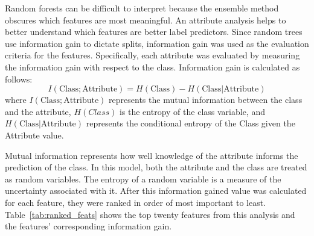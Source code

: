 \documentclass[10pt,twocolumn,conference]{IEEEtran}
\begin{document}
Random forests can be difficult to interpret because the ensemble method obscures which features are most meaningful.  An attribute analysis helps to better understand which features are better label predictors.  Since random trees use information gain to dictate splits, information gain was used as the evaluation criteria for the features.  Specifically, each attribute was evaluated by measuring the information gain with respect to the class.  Information gain is calculated as follows:
\begin{equation}
I(\text{Class}; \text{Attribute}) = H(\text{Class}) - H(\text{Class} | \text{Attribute})
\end{equation} \label{eq:info_gained}
where $I(\text{Class}; \text{Attribute})$ represents the mutual information between the class and the attribute, $H(Class)$ is the entropy of the class variable, and  $H(\text{Class} | \text{Attribute})$ represents the conditional entropy of the Class given the Attribute value.  

Mutual information represents how well knowledge of the attribute informs the prediction of the class.  In this model, both the attribute and the class are treated as random variables.  The entropy of a random variable is a measure of the uncertainty associated with it. After this information gained value was calculated for each feature, they were ranked in order of most important to least.  Table~\ref{tab:ranked_feats} shows the top twenty features from this analysis and the features' corresponding information gain.
\end{document}
